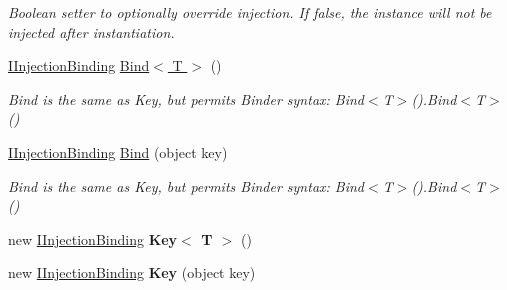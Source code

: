 \begin{DoxyCompactItemize}
\begin{DoxyCompactList}\small\item\em Boolean setter to optionally override injection. If false, the instance will not be injected after instantiation. \end{DoxyCompactList}\item 
\hypertarget{classstrange_1_1extensions_1_1injector_1_1impl_1_1_injection_binding_aa554c0eb764085090478664db21467df}{\hyperlink{interfacestrange_1_1extensions_1_1injector_1_1api_1_1_i_injection_binding}{I\-Injection\-Binding} \hyperlink{classstrange_1_1extensions_1_1injector_1_1impl_1_1_injection_binding_aa554c0eb764085090478664db21467df}{Bind$<$ T $>$} ()}\label{classstrange_1_1extensions_1_1injector_1_1impl_1_1_injection_binding_aa554c0eb764085090478664db21467df}

\begin{DoxyCompactList}\small\item\em Bind is the same as Key, but permits Binder syntax\-: {\ttfamily Bind$<$T$>$().Bind$<$T$>$()} \end{DoxyCompactList}\item 
\hypertarget{classstrange_1_1extensions_1_1injector_1_1impl_1_1_injection_binding_af14ba168b6cc7a2624fe035a933b7c33}{\hyperlink{interfacestrange_1_1extensions_1_1injector_1_1api_1_1_i_injection_binding}{I\-Injection\-Binding} \hyperlink{classstrange_1_1extensions_1_1injector_1_1impl_1_1_injection_binding_af14ba168b6cc7a2624fe035a933b7c33}{Bind} (object key)}\label{classstrange_1_1extensions_1_1injector_1_1impl_1_1_injection_binding_af14ba168b6cc7a2624fe035a933b7c33}

\begin{DoxyCompactList}\small\item\em Bind is the same as Key, but permits Binder syntax\-: {\ttfamily Bind$<$T$>$().Bind$<$T$>$()} \end{DoxyCompactList}\item 
\hypertarget{classstrange_1_1extensions_1_1injector_1_1impl_1_1_injection_binding_aef52ed6a0ff8e7fffacce72b3d1b4c19}{new \hyperlink{interfacestrange_1_1extensions_1_1injector_1_1api_1_1_i_injection_binding}{I\-Injection\-Binding} {\bfseries Key$<$ T $>$} ()}\label{classstrange_1_1extensions_1_1injector_1_1impl_1_1_injection_binding_aef52ed6a0ff8e7fffacce72b3d1b4c19}

\item 
\hypertarget{classstrange_1_1extensions_1_1injector_1_1impl_1_1_injection_binding_ae7141199262e6a7c63c2b0f6489933a9}{new \hyperlink{interfacestrange_1_1extensions_1_1injector_1_1api_1_1_i_injection_binding}{I\-Injection\-Binding} {\bfseries Key} (object key)}\label{classstrange_1_1extensions_1_1injector_1_1impl_1_1_injection_binding_ae7141199262e6a7c63c2b0f6489933a9}


\end{DoxyCompactItemize}
